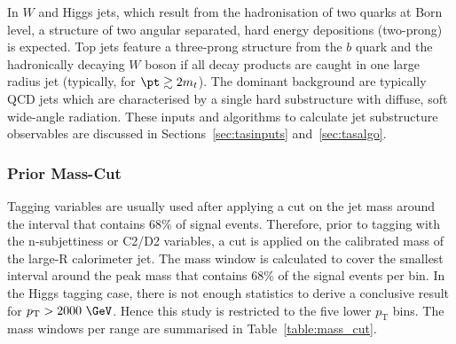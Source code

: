In $W$ and Higgs jets, which result from the hadronisation of two quarks at Born level, a structure of two angular separated, hard energy depositions (two-prong) is expected. Top jets feature a three-prong structure from the $b$ quark and the hadronically decaying $W$ boson if all decay products are caught in one large radius jet (typically, for  $\pt\gtrsim 2m_{t}$). The dominant background are typically QCD jets which are characterised by a single hard substructure with diffuse, soft wide-angle radiation. These inputs and algorithms to calculate jet substructure observables are discussed in Sections~\ref{sec:tasinputs} and~\ref{sec:tasalgo}.

\subsubsection{Prior Mass-Cut}
Tagging variables are usually used after applying a cut on the jet mass around the interval that contains 68\% of signal events. Therefore, prior to tagging with the n-subjettiness or C2/D2 variables, a cut is applied on the calibrated mass of the large-R calorimeter jet. The mass window is calculated to cover the smallest interval around the peak mass that contains 68\% of the signal events per \pt bin. In the Higgs tagging case, there is not enough statistics to derive a conclusive result for $p_{\mathrm{T}} > 2000~\GeV$. Hence this study is restricted to the five lower $p_{\mathrm{T}}$ bins. The mass windows per \pt range are summarised in Table~\ref{table:mass_cut}.

